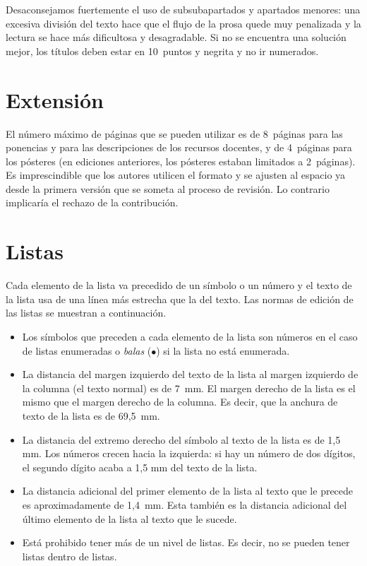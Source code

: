\documentclass[twocolumn,twoside,a4paper, 10pt]{article}
\begin{document}
Desaconsejamos fuertemente el uso de subsubapartados y apartados
menores: una excesiva división del texto hace que el flujo de la prosa
quede muy penalizada y la lectura se hace más dificultosa y
desagradable.  Si no se encuentra una solución mejor, los títulos
deben estar en 10~puntos y negrita y no ir numerados.

\section{Extensión}

El número máximo de páginas que se pueden utilizar es de 8~páginas para las ponencias 
y para las descripciones de los recursos docentes, y de 4~páginas para los pósteres 
(en ediciones anteriores, los pósteres estaban limitados a 2~páginas). 
Es imprescindible que los autores utilicen el formato y se ajusten al espacio ya 
desde la primera versión que se someta al proceso de revisión. Lo contrario implicaría 
el rechazo de la contribución.

\section{Listas}


Cada elemento de la lista va precedido de un símbolo o un número y 
el texto de la lista usa de una línea más estrecha que la del texto. 
Las normas de edición de las listas se muestran a continuación.

\begin{itemize}
	\item Los símbolos que preceden a cada elemento de la lista son 
	números en el caso de listas enumeradas o \emph{balas} 
	($\bullet$) si la lista no está enumerada.
	
	\item La distancia del margen izquierdo del texto de la lista al
	margen izquierdo de la columna (el texto normal) es de 7~mm.  El
	margen derecho de la lista es el mismo que el margen derecho de la
	columna. Es decir, que la anchura de texto de la lista es de 69,5~mm.
	
	\item La distancia del extremo derecho del símbolo al texto de la 
	lista es de 1,5 mm. Los números crecen hacia la izquierda: si hay 
	un número de dos dígitos, el segundo dígito acaba a 1,5 mm del 
	texto de la lista.
	
	\item La distancia adicional del primer elemento de la lista al texto que 
	le precede es aproximadamente de 1,4~mm. Esta también es la distancia adicional del último 
	elemento de la lista al texto que le sucede.
	
	\item Está prohibido tener más de un nivel de 
	listas. Es decir, no se pueden tener listas dentro de listas.
\end{itemize}
\end{document}
